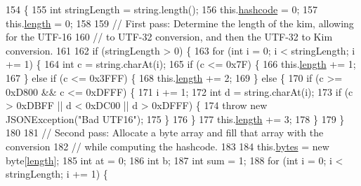 \begin{DoxyCode}
154                                                    \{
155         \textcolor{keywordtype}{int} stringLength = \textcolor{keywordtype}{string}.length();
156         this.\hyperlink{classorg_1_1json_1_1_kim_aab8a2339df2bbc09510350775572ecf2}{hashcode} = 0;
157         this.\hyperlink{classorg_1_1json_1_1_kim_a6caa186b493021e083e4efbf734e3a40}{length} = 0;
158 
159 \textcolor{comment}{// First pass: Determine the length of the kim, allowing for the UTF-16}
160 \textcolor{comment}{// to UTF-32 conversion, and then the UTF-32 to Kim conversion.}
161 
162         \textcolor{keywordflow}{if} (stringLength > 0) \{
163             \textcolor{keywordflow}{for} (\textcolor{keywordtype}{int} i = 0; i < stringLength; i += 1) \{
164                 \textcolor{keywordtype}{int} c = \textcolor{keywordtype}{string}.charAt(i);
165                 \textcolor{keywordflow}{if} (c <= 0x7F) \{
166                     this.\hyperlink{classorg_1_1json_1_1_kim_a6caa186b493021e083e4efbf734e3a40}{length} += 1;
167                 \} \textcolor{keywordflow}{else} \textcolor{keywordflow}{if} (c <= 0x3FFF) \{
168                     this.\hyperlink{classorg_1_1json_1_1_kim_a6caa186b493021e083e4efbf734e3a40}{length} += 2;
169                 \} \textcolor{keywordflow}{else} \{
170                     \textcolor{keywordflow}{if} (c >= 0xD800 && c <= 0xDFFF) \{
171                         i += 1;
172                         \textcolor{keywordtype}{int} d = \textcolor{keywordtype}{string}.charAt(i);
173                         \textcolor{keywordflow}{if} (c > 0xDBFF || d < 0xDC00 || d > 0xDFFF) \{
174                             \textcolor{keywordflow}{throw} \textcolor{keyword}{new} JSONException(\textcolor{stringliteral}{"Bad UTF16"});
175                         \}
176                     \}
177                     this.\hyperlink{classorg_1_1json_1_1_kim_a6caa186b493021e083e4efbf734e3a40}{length} += 3;
178                 \}
179             \}
180 
181 \textcolor{comment}{// Second pass: Allocate a byte array and fill that array with the conversion}
182 \textcolor{comment}{// while computing the hashcode.}
183 
184             this.\hyperlink{classorg_1_1json_1_1_kim_aca37e9b2f118afc91bc8d1f37512819b}{bytes} = \textcolor{keyword}{new} byte[\hyperlink{classorg_1_1json_1_1_kim_a6caa186b493021e083e4efbf734e3a40}{length}];
185             \textcolor{keywordtype}{int} at = 0;
186             \textcolor{keywordtype}{int} b;
187             \textcolor{keywordtype}{int} sum = 1;
188             \textcolor{keywordflow}{for} (\textcolor{keywordtype}{int} i = 0; i < stringLength; i += 1) \{

\end{DoxyCode}

